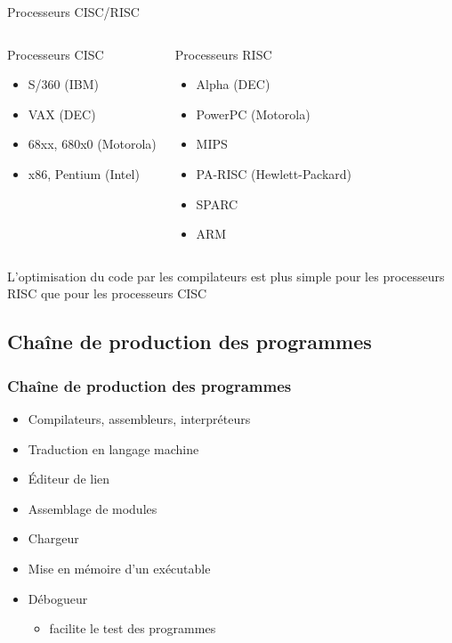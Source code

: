\begin{frame}{Processeurs CISC/RISC}
\begin{columns}
\begin{exampleblock}{Processeurs CISC}
\begin{itemize}
\item S/360 (IBM)
\item VAX (DEC)
\item 68xx, 680x0 (Motorola)
\item x86, Pentium (Intel)
\end{itemize}

\end{exampleblock}
\begin{exampleblock}{Processeurs RISC}
\begin{itemize}
\item Alpha (DEC)
\item PowerPC (Motorola)
\item MIPS
\item PA-RISC (Hewlett-Packard)
\item SPARC
\item ARM
\end{itemize}
\end{exampleblock}
\end{columns}
\begin{center}
L'optimisation du code par les compilateurs est plus simple pour les processeurs RISC que pour les processeurs CISC
\end{center}
\end{frame}



\subsection{Chaîne de production des programmes}
\begin{frame}
\frametitle{Chaîne de production des programmes}
\begin{itemize}
\item Compilateurs, assembleurs, interpréteurs
\item Traduction en langage machine
\item Éditeur de lien
\item Assemblage de modules
\item Chargeur
\item Mise en mémoire d’un exécutable
\item Débogueur
\begin{itemize}
\item facilite le test des programmes
\end{itemize}
\end{itemize}
\end{frame}


